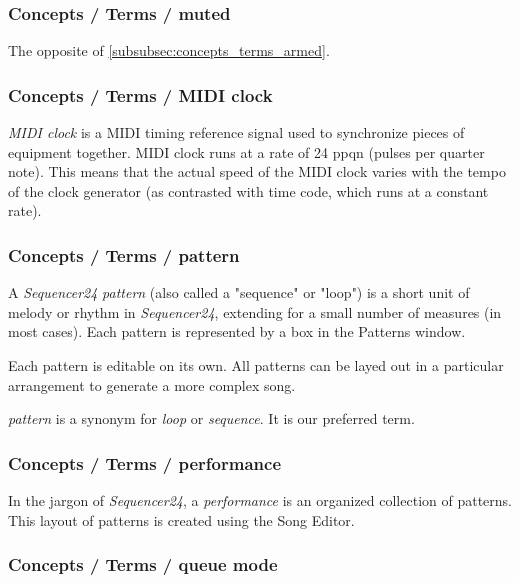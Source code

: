 \subsubsection{Concepts / Terms / muted}
\label{subsubsec:concepts_terms_muted}

   The opposite of \ref{subsubsec:concepts_terms_armed}.

\subsubsection{Concepts / Terms / MIDI clock}
\label{subsubsec:concepts_terms_midi_clock}

   \textsl{MIDI clock} is
   a MIDI timing reference signal used to synchronize pieces of equipment
   together. MIDI clock runs at a rate of 24 ppqn (pulses per quarter note).
   This means that the actual speed of the MIDI clock varies with the tempo
   of the clock generator (as contrasted with time code, which runs at a
   constant rate).

\subsubsection{Concepts / Terms / pattern}
\label{subsubsec:concepts_terms_pattern}

   A \textsl{Sequencer24} \textsl{pattern}
   (also called a "sequence" or "loop")
   is a short unit of melody or rhythm in \textsl{Sequencer24},
   extending for a small number of measures (in most cases).
   Each pattern is represented by a box in the Patterns window.

   Each pattern is editable on its own.  All patterns can be layed out in
   a particular arrangement to generate a more complex song.

   \textsl{pattern} is a synonym for \textsl{loop} or \textsl{sequence}.
   It is our preferred term.

\subsubsection{Concepts / Terms / performance}
\label{subsubsec:concepts_terms_performance}

   In the jargon of \textsl{Sequencer24}, a
   \textsl{performance} is an organized collection of patterns.
   This layout of patterns is created using the Song Editor.

\subsubsection{Concepts / Terms / queue mode}
\label{subsubsec:concepts_terms_queue_mode}

